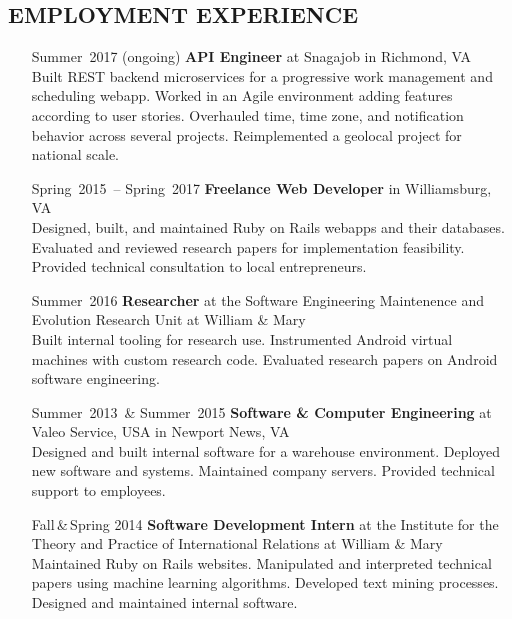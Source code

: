 \documentclass{res}     %
\begin{document}
\begin{resume}
\section{EMPLOYMENT EXPERIENCE}
\vspace{5mm}
\begin{itemize}[font=\itshape,align=parleft,labelwidth=3cm,leftmargin=2cm]
    \item[Summer~2017 (ongoing)]
        \textbf{API Engineer}
        at Snagajob
        in Richmond, VA
        \vspace{1mm} \\
        Built REST backend microservices for a progressive work management and scheduling webapp.
        Worked in an Agile environment adding features according to user stories.
        Overhauled time, time zone, and notification behavior across several projects.
        Reimplemented a geolocal project for national scale.
    \item[Spring~2015~-- Spring~2017]
        \textbf{Freelance Web Developer}
        in Williamsburg, VA
        \vspace{1mm} \\
        Designed, built, and maintained Ruby on Rails webapps and their databases.
        Evaluated and reviewed research papers for implementation feasibility.
        Provided technical consultation to local entrepreneurs.
    \item[Summer~2016]
        \textbf{Researcher}
        at the Software Engineering Maintenence and Evolution Research Unit
        at William \& Mary
        \vspace{1mm} \\
        Built internal tooling for research use.
        Instrumented Android virtual machines with custom research code.
        Evaluated research papers on Android software engineering.
    \item[Summer~2013~\& Summer~2015]
        \textbf{Software \& Computer Engineering}
        at Valeo Service, USA
        in Newport News, VA
        \vspace{1mm} \\
        Designed and built internal software for a warehouse environment.
        Deployed new software and systems.
        Maintained company servers.
        Provided technical support to employees.
    \item[Fall\,\&\,Spring 2014]
        \textbf{Software Development Intern}
        at the Institute for the Theory and Practice of International Relations
        at William \& Mary
        \vspace{1mm} \\
        Maintained Ruby on Rails websites.
        Manipulated and interpreted technical papers using machine learning algorithms.
        Developed text mining processes.
        Designed and maintained internal software.
\end{itemize}


\end{resume}
\end{document}
